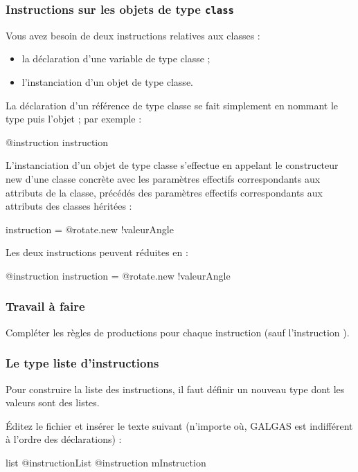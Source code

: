 \subsubsection{Instructions sur les objets de type \texttt{class}}

Vous avez besoin de deux instructions relatives aux classes :
\begin{itemize}
  \item la déclaration d'une variable de type classe ;
  \item l'instanciation d'un objet de type classe.
\end{itemize}

La déclaration d'un référence de type classe se fait simplement en nommant le type puis l'objet ; par exemple :
\begin{galgas}
@instruction instruction
\end{galgas}

L'instanciation d'un objet de type classe s'effectue en appelant le constructeur new d'une classe concrète avec les paramètres effectifs correspondants aux attributs de la classe, précédés des paramètres effectifs correspondants aux attributs des classes héritées :
\begin{galgas}
instruction = @rotate.new {!valeurAngle}
\end{galgas}

Les deux instructions peuvent réduites en :
\begin{galgas}
@instruction instruction = @rotate.new {!valeurAngle}
\end{galgas}

\subsubsection{Travail à faire}
Compléter les règles de productions pour chaque instruction (sauf l'instruction ).

\subsubsection{Le type liste d'instructions}
Pour construire la liste des instructions, il faut définir un nouveau type dont les valeurs sont des listes.

Éditez le fichier  et insérer le texte suivant (n’importe où, GALGAS est indifférent à l’ordre des déclarations) :

\begin{galgas}
list @instructionList {
  @instruction mInstruction
}
\end{galgas}

